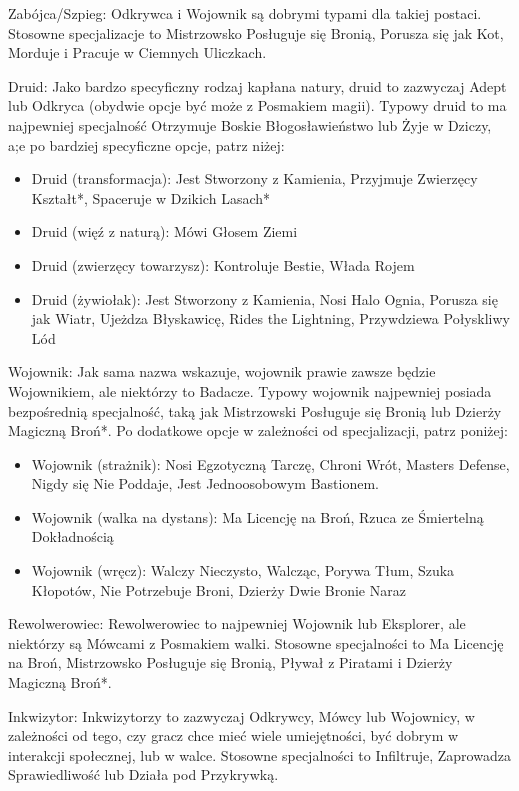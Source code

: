 Zabójca/Szpieg: Odkrywca i Wojownik są dobrymi typami dla takiej postaci. Stosowne specjalizacje to Mistrzowsko Posługuje się Bronią, Porusza się jak Kot, Morduje i Pracuje w Ciemnych Uliczkach.

Druid: Jako bardzo specyficzny rodzaj kapłana natury, druid to zazwyczaj Adept lub Odkryca (obydwie opcje być może z Posmakiem magii). Typowy druid to ma najpewniej specjalność Otrzymuje Boskie Błogosławieństwo lub Żyje w Dziczy, a;e po bardziej specyficzne opcje, patrz niżej:

\begin{itemize}
\item Druid (transformacja): Jest Stworzony z Kamienia,  Przyjmuje Zwierzęcy Kształt*, Spaceruje w Dzikich Lasach*
\item Druid (więź z naturą): Mówi Głosem Ziemi
\item Druid (zwierzęcy towarzysz): Kontroluje Bestie, Włada Rojem
\item Druid (żywiołak): Jest Stworzony z Kamienia, Nosi Halo Ognia, Porusza się jak Wiatr, Ujeżdza Błyskawicę,  Rides the Lightning, Przywdziewa Połyskliwy Lód
\end{itemize}

Wojownik: Jak sama nazwa wskazuje, wojownik prawie zawsze będzie Wojownikiem, ale niektórzy to Badacze. Typowy wojownik najpewniej posiada bezpośrednią specjalność, taką jak Mistrzowski Posługuje się Bronią lub Dzierży Magiczną Broń*. Po dodatkowe opcje w zależności od specjalizacji, patrz poniżej:

\begin{itemize}
\item Wojownik (strażnik): Nosi Egzotyczną Tarczę, Chroni Wrót, Masters Defense, Nigdy się Nie Poddaje, Jest Jednoosobowym Bastionem.
\item Wojownik (walka na dystans): Ma Licencję na Broń, Rzuca ze Śmiertelną Dokładnością
\item Wojownik (wręcz): Walczy Nieczysto, Walcząc, Porywa Tłum, Szuka Kłopotów, Nie Potrzebuje Broni, Dzierży Dwie Bronie Naraz
\end{itemize}

Rewolwerowiec: Rewolwerowiec to najpewniej Wojownik lub Eksplorer, ale niektórzy są Mówcami z Posmakiem walki. Stosowne specjalności to Ma Licencję na Broń, Mistrzowsko Posługuje się Bronią, Pływał z Piratami i Dzierży Magiczną Broń*.

Inkwizytor: Inkwizytorzy to zazwyczaj Odkrywcy, Mówcy lub Wojownicy, w zależności od tego, czy gracz chce mieć wiele umiejętności, być dobrym w interakcji społecznej, lub w walce. Stosowne specjalności to Infiltruje, Zaprowadza Sprawiedliwość lub Działa pod Przykrywką.

